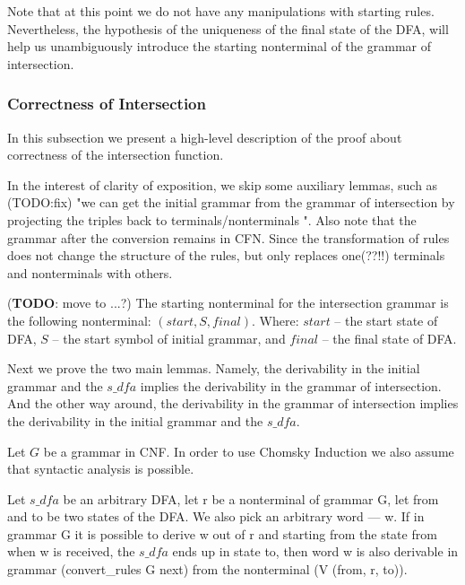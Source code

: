 Note that at this point we do not have any manipulations with starting rules. Nevertheless, the hypothesis of the uniqueness of the final state of the DFA, will help us unambiguously introduce the starting nonterminal of the grammar of intersection.

\subsubsection{Correctness of Intersection}

In this subsection we present a high-level description of the proof about correctness of the intersection function.

In the interest of clarity of exposition, we skip some auxiliary lemmas, such as (TODO:fix) "we can get the initial grammar from the grammar of intersection by projecting the triples back to terminals/nonterminals ". Also note that the grammar after the conversion remains in CFN. Since the transformation of rules does not change the structure of the rules, but only replaces one(??!!) terminals and nonterminals with others.


(\textbf{TODO}: move to ...?)
The starting nonterminal for the intersection grammar is the following nonterminal: $(start, S, final)$. 
Where: $start$ -- the start state of DFA, $S$ -- the start symbol of initial grammar, and $final$ -- the final state of DFA. 


Next we prove the two main lemmas. Namely, the derivability in the initial grammar and the $s\_dfa$ implies the derivability in the grammar of intersection. And the other way around, the derivability in the grammar of intersection implies the derivability in the initial grammar and the $s\_dfa$.

Let $G$ be a grammar in CNF. In order to use Chomsky Induction we also assume that syntactic analysis is possible. 


\begin{theorem}
    Let $s\_dfa$ be an arbitrary DFA, let r be a nonterminal of grammar G, let from and to be two states of the DFA. We also pick an arbitrary word --- w. If in grammar G it is possible to derive w out of r and starting from the state from when w is received, the $s\_dfa$ ends up in state to, then word w is also derivable in grammar (convert\_rules G next) from the nonterminal (V (from, r, to)).
\end{theorem}

